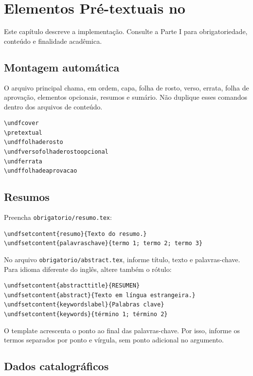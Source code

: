 \chapter{Elementos Pré-textuais no \marcaUnDFTeX}

Este capítulo descreve a implementação. Consulte a Parte I para obrigatoriedade, conteúdo e finalidade acadêmica.

\section{Montagem automática}

O arquivo principal chama, em ordem, capa, folha de rosto, verso, errata, folha de aprovação, elementos opcionais, resumos e sumário. Não duplique esses comandos dentro dos arquivos de conteúdo.

\begin{lstlisting}
\undfcover
\pretextual
\undffolhaderosto
\undfversofolhaderostoopcional
\undferrata
\undffolhadeaprovacao
\end{lstlisting}

\section{Resumos}

Preencha \texttt{obrigatorio/resumo.tex}:

\begin{lstlisting}
\undfsetcontent{resumo}{Texto do resumo.}
\undfsetcontent{palavraschave}{termo 1; termo 2; termo 3}
\end{lstlisting}

No arquivo \texttt{obrigatorio/abstract.tex}, informe título, texto e palavras-chave. Para idioma diferente do inglês, altere também o rótulo:

\begin{lstlisting}
\undfsetcontent{abstracttitle}{RESUMEN}
\undfsetcontent{abstract}{Texto em língua estrangeira.}
\undfsetcontent{keywordslabel}{Palabras clave}
\undfsetcontent{keywords}{término 1; término 2}
\end{lstlisting}

O template acrescenta o ponto ao final das palavras-chave. Por isso, informe os termos separados por ponto e vírgula, sem ponto adicional no argumento.

\section{Dados catalográficos}

